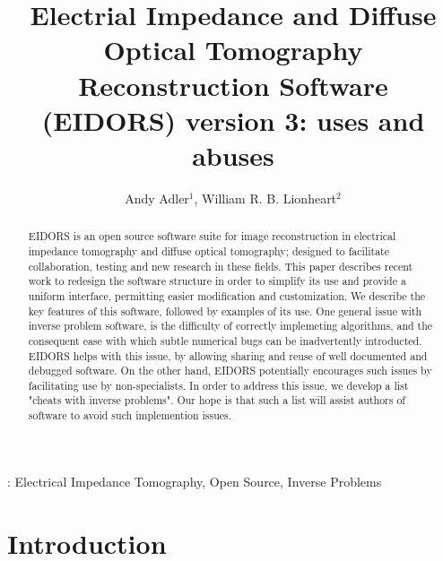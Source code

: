 \documentclass[12pt]{iopart}
\begin{document}
\title{Electrial Impedance and Diffuse Optical
       Tomography Reconstruction Software (EIDORS) version 3: uses and abuses}
\author{Andy Adler$^1$, William R. B. Lionheart$^2$}
\address{$^1$ School of Information Technology and Engineering (SITE), University of Ottawa, Canada}
\address{$^2$ School of Mathematics, University of Manchester, U.K.}

\begin{abstract} %

EIDORS is an open source software suite for image reconstruction in
electrical impedance tomography and diffuse optical tomography;
designed to facilitate collaboration, testing and new research
in these fields.  This paper describes recent work to
redesign the software structure in order to simplify its use
and provide a uniform interface,
permitting easier modification and customization.
We describe the key features of this software, followed by
examples of its use.
One general issue with inverse problem software, is the difficulty
of correctly implemeting algorithms, and the consequent ease with
which subtle numerical bugs can be inadvertently introducted.
EIDORS helps with this issue, by allowing sharing and reuse
of well documented and debugged software. On the other hand, 
EIDORS potentially encourages such issues by facilitating use
by non-specialists. In order to address this issue, we develop
a list "cheats with inverse problems". Our hope is that such
a list will assist authors of software to avoid such implemention
issues.


\end{abstract}
:
Electrical Impedance Tomography,
Open Source,
Inverse Problems

\section{Introduction}
\end{document}
